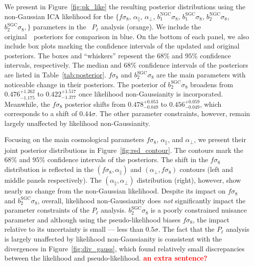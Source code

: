 \documentclass[12pt, letterpaper, preprint]{aastex}
\newcommand{\todo}[1]{{\bf \textcolor{red}{#1}}}
\newcommand{\Beut}{\citetalias{beutler2017}}
\begin{document}
We present in Figure~\ref{fig:pk_like} the resulting posterior 
distributions using the non-Gaussian ICA likelihood for the 
$\big \{f \sigma_8$, $\alpha_\parallel$, $\alpha_\perp$, 
$b_1^\mathrm{NGC} \sigma_8$, $b_1^\mathrm{SGC} \sigma_8$, 
$b_2^\mathrm{NGC} \sigma_8$, $b_2^\mathrm{SGC} \sigma_8,\big \}$
parameters in the \Beut~$P_\ell$ analysis (orange). We include 
the original~\Beut~posteriors for comparison in blue. On the 
bottom of each panel, we also include box plots marking the 
confidence intervals of the updated and original posteriors. 
The boxes and ``whiskers'' repesent the $68\%$ and $95\%$ 
confidence intervals, respectively. The median and $68\%$ 
confidence intervals of the posteriors are listed in Table~\ref{tab:posterior}.
$f \sigma_8$ and $b_2^\mathrm{SGC} \sigma_8$ are the main parameters with 
noticeable change in their posteriors. The posterior of $b_2^\mathrm{SGC} \sigma_8$
broadens from $0.476^{+1.262}_{-1.175}$ to $0.422^{+1.517}_{-1.377}$ once likelihood 
non-Gaussianity is incorporated. Meanwhile, the $f \sigma_8$ posterior
shifts from $0.478^{+0.053}_{-0.049}$ to $0.456^{+0.059}_{-0.049}$, which 
corresponds to a  shift of $0.44 \sigma$. The other parameter constraints, 
however, remain largely unaffected by likelihood non-Gaussianity. 

Focusing on the main cosmological parameters $f \sigma_8$, 
$\alpha_\parallel$, and $\alpha_\perp$, we present their 
joint posterior distributions in Figure~\ref{fig:rsd_contour}.  
The contours mark the $68\%$ and $95\%$ confidence intervals
of the posteriors. The shift in the $f \sigma_8$ distribution 
is reflected in the
$(f\sigma_8, \alpha_\parallel)$ and $(\alpha_\perp, f\sigma_8)$ 
contours (left and middle panels respectively). The 
$(\alpha_\parallel, \alpha_\perp)$ distribution (right), however, show nearly 
no change from the non-Gaussian likelihood. %
Despite its impact on $f \sigma_8$ and $b_2^\mathrm{SGC} \sigma_8$, 
overall, likelihood non-Gaussianity does \emph{not}
significantly impact the parameter constraints of the $P_\ell$ 
analysis. $b_2^\mathrm{SGC} \sigma_8$ is a poorly constrained nuisance 
parameter and although using the pseudo-likelihood biases $f \sigma_8$, 
the impact relative to its uncertainty is small --- less than $0.5 \sigma$. 
The fact that the $P_\ell$ analysis is largely unaffected by likelihood 
non-Gaussianity is consistent with the divergences in 
Figure~\ref{fig:div_gauss}, which found relatively small discrepancies 
between the likelihood and pseudo-likelihood. 
\todo{an extra sentence?}
\end{document}

